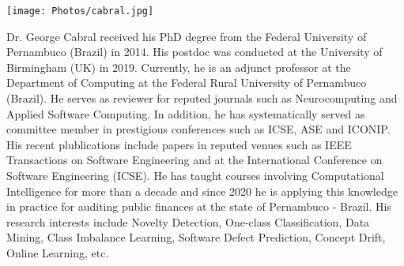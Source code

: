 \begin{center}
\texttt{[image: Photos/cabral.jpg]}
\end{center}

Dr. George Cabral received his PhD degree from the Federal University of Pernambuco (Brazil) in 2014. His postdoc was conducted at the University of Birmingham (UK) in 2019. Currently, he is an adjunct professor at the Department of Computing at the Federal Rural University of Pernambuco (Brazil). He serves as reviewer for reputed journals such as Neurocomputing and Applied Software Computing. In addition, he has systematically served as committee member in prestigious conferences such as ICSE, ASE and ICONIP. His recent plublications include papers in reputed venues such as IEEE Transactions on Software Engineering and at the International Conference on Software Engineering (ICSE). He has taught courses involving Computational Intelligence for more than a decade and since 2020 he is applying this knowledge in practice for auditing public finances at the state of Pernambuco - Brazil. His research interests include Novelty Detection, One-class Classification, Data Mining, Class Imbalance Learning, Software Defect Prediction, Concept Drift, Online Learning, etc.
